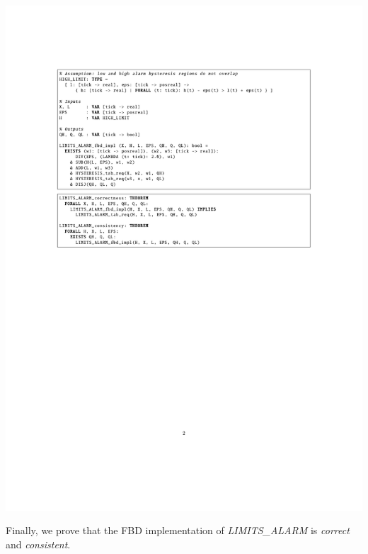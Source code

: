 \documentclass[a0,landscape]{a0poster}
\def\graphspacing{\vspace{.5cm}}
\newcommand{\capcolor}[1]{{\color{Black} #1}}
\newcommand{\var}[1]{{\small \textit{#1}}}
\begin{document}
\begin{multicols}{4}
\begin{center}\graphspacing
\includegraphics[width=\linewidth]{figures/limits_alarm/limits_alarm_pvs_fbd_impl}
\end{center}\graphspacing

\noindent Finally, we prove that the FBD implementation of \var{LIMITS\_ALARM} is {\color{BrickRed} \emph{correct}} and {\color{BrickRed} \emph{consistent}}.


\end{multicols}
\end{document}
